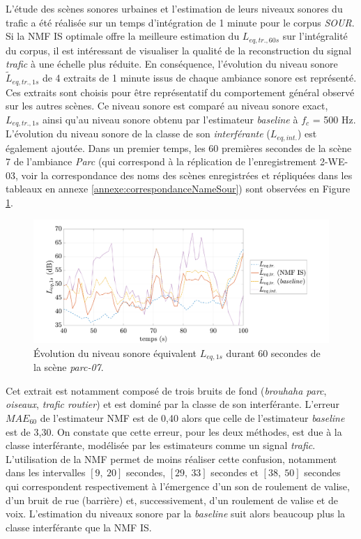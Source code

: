 L'étude des scènes sonores urbaines et l'estimation de leurs niveaux sonores du trafic a été réalisée sur un temps d'intégration de 1 minute pour le corpus \textit{SOUR}. 
Si la NMF IS optimale offre la meilleure estimation du $L_{eq,tr.,60s}$ sur l'intégralité du corpus, il est intéressant de visualiser la qualité de la reconstruction du signal \textit{trafic} à une échelle plus réduite. En conséquence, l'évolution du niveau sonore $\tilde{L}_{eq,tr.,1s}$ de 4 extraits de 1 minute issus de chaque ambiance sonore est représenté. Ces extraits sont choisis pour être représentatif du comportement général observé sur les autres scènes. Ce niveau sonore est comparé au niveau sonore exact, $L_{eq,tr.,1s}$ ainsi qu'au niveau sonore obtenu par l'estimateur \textit{baseline} à $f_c$ = 500 Hz. L'évolution du niveau sonore de la classe de son \textit{interférante} ($L_{eq,int.}$) est également ajoutée. 
Dans un premier temps, les 60 premières secondes de la scène 7 de l'ambiance \textit{Parc} (qui correspond à la réplication de l'enregistrement 2-WE-03, voir la correspondance des noms des scènes enregistrées et répliquées dans les tableaux en annexe \ref{annexe:correspondanceNameSour}) sont observées en Figure \ref{fig:Lp_parc}.


\begin{figure}[h!]
\centering
\includegraphics[width=.8\linewidth]{./figures/NMF/Lp_park_7.pdf} 
\caption{Évolution du niveau sonore équivalent $L_{eq, 1s}$ durant 60 secondes de la scène \textit{parc-07}.} 
\label{fig:Lp_parc}
\end{figure}

Cet extrait est notamment composé de trois bruits de fond (\textit{brouhaha parc}, \textit{oiseaux}, \textit{trafic routier}) et est dominé par la classe de son interférante. 
L'erreur $MAE_{60}$ de l'estimateur NMF est de 0,40 alors que celle de l'estimateur \textit{baseline} est de 3,30. 
On constate que cette erreur, pour les deux méthodes, est due à la classe interférante, modélisée par les estimateurs comme un signal \textit{trafic}. L'utilisation de la NMF permet de moins réaliser cette confusion, notamment dans les intervalles $\left[ 9,~20 \right]$ secondes, $\left[ 29,~33 \right]$ secondes et $\left[ 38,~50 \right]$ secondes qui correspondent respectivement à l'émergence d'un son de roulement de valise, d'un bruit de rue (barrière) et, successivement, d'un roulement de valise et de voix. L'estimation du niveaux sonore par la \textit{baseline} suit alors beaucoup plus la classe interférante que la NMF IS. 


